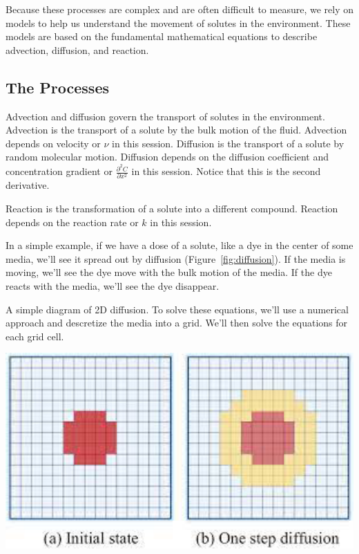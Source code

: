 \documentclass{tufte-handout}\usepackage[]{graphicx}\usepackage[]{xcolor}
\begin{document}
Because these processes are complex and are often difficult to measure, we rely on models to help us understand the movement of solutes in the environment. These models are based on the fundamental mathematical equations to describe advection, diffusion, and reaction.

\subsection{The Processes}

Advection and diffusion govern the transport of solutes in the environment. Advection is the transport of a solute by the bulk motion of the fluid. Advection depends on velocity or $\nu$ in this session. Diffusion is the transport of a solute by random molecular motion. Diffusion depends on the diffusion coefficient and concentration gradient or $\frac{\partial^2 C}{\partial x^2}$ in this session. Notice that this is the second derivative. 

Reaction is the transformation of a solute into a different compound. Reaction depends on the reaction rate or $k$ in this session.

In a simple example, if we have a dose of a solute, like a dye in the center of some media, we'll see it spread out by diffusion (Figure~\ref{fig:diffusion}). If the media is moving, we'll see the dye move with the bulk motion of the media. If the dye reacts with the media, we'll see the dye disappear.

\begin{marginfigure}
\caption{A simple diagram of 2D diffusion. To solve these equations, we'll use a numerical approach and descretize the media into a grid. We'll then solve the equations for each grid cell.}
\label{fig:diffusion}
\includegraphics[width=1.0\textwidth]{graphics/2D_diffusion.png}
\end{marginfigure}
\end{document}

